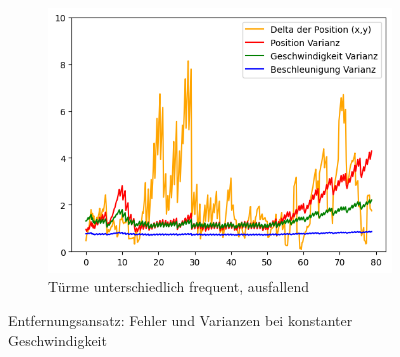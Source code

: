 \begin{figure}
\begin{subfigure}{.333\textwidth}
        \includegraphics[width=.9\linewidth]{Ergebnisse/plots_ungenauigkeiten/distanz/distanz_dyn_acc_flag_freq.png}
        \caption{Türme unterschiedlich frequent, ausfallend}
    \end{subfigure}
    \caption{Entfernungsansatz: Fehler und Varianzen bei konstanter Geschwindigkeit}
    \label{abb:distanz-da-fehler}
\end{figure}
